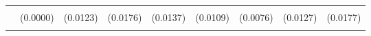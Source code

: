 \begin{table}[!h]
\begin{tabular}[t]{lllllllll}
\addlinespace
\cellcolor{gray!10}{WSLS} & \cellcolor{gray!10}{0.0000} & \cellcolor{gray!10}{0.0060} & \cellcolor{gray!10}{0.0565**} & \cellcolor{gray!10}{0.0274*} & \cellcolor{gray!10}{0.0205} & \cellcolor{gray!10}{0.0098} & \cellcolor{gray!10}{0.0181} & \cellcolor{gray!10}{0.0404*}\\
 & (0.0000) & (0.0123) & (0.0176) & (0.0137) & (0.0109) & (0.0076) & (0.0127) & (0.0177)\\
\cellcolor{gray!10}{T2} & \cellcolor{gray!10}{0.0884} & \cellcolor{gray!10}{0.1625**} & \cellcolor{gray!10}{0.0000} & \cellcolor{gray!10}{0.0301} & \cellcolor{gray!10}{0.0240} & \cellcolor{gray!10}{0.0884**} & \cellcolor{gray!10}{0.1100**} & \cellcolor{gray!10}{0.0578}\\
\bottomrule
\end{tabular}
\end{table}
